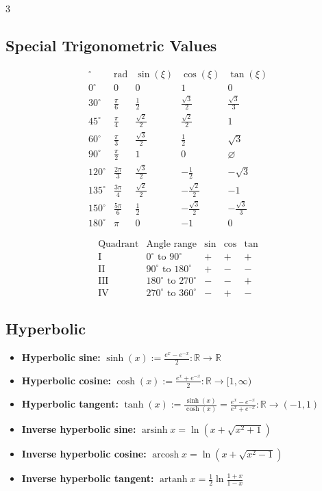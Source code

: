 \begin{multicols}{3}
\subsection*{Special Trigonometric Values}
\[
\begin{array}{c|c|c|c|c}
^\circ & \mathrm{rad} & \sin(\xi) & \cos(\xi) & \tan(\xi)\\
\hline
0^\circ & 0 & 0 & 1 & 0\\
30^\circ & \frac{\pi}{6} & \frac12 & \frac{\sqrt3}{2} & \frac{\sqrt3}{3}\\
45^\circ & \frac{\pi}{4} & \frac{\sqrt2}{2} & \frac{\sqrt2}{2} & 1\\
60^\circ & \frac{\pi}{3} & \frac{\sqrt3}{2} & \frac12 & \sqrt3\\
90^\circ & \frac{\pi}{2} & 1 & 0 & \varnothing\\
120^\circ & \frac{2\pi}{3} & \frac{\sqrt3}{2} & -\frac12 & -\sqrt3\\
135^\circ & \frac{3\pi}{4} & \frac{\sqrt2}{2} & -\frac{\sqrt2}{2} & -1\\
150^\circ & \frac{5\pi}{6} & \frac12 & -\frac{\sqrt3}{2} & -\frac{\sqrt3}{3}\\
180^\circ & \pi & 0 & -1 & 0
\end{array}
\]

\[
\begin{array}{c|c|c|c|c}
\text{Quadrant} & \text{Angle range} & \sin & \cos & \tan \\
\hline
\text{I} & 0^\circ \text{ to } 90^\circ & + & + & + \\
\text{II} & 90^\circ \text{ to } 180^\circ & + & - & - \\
\text{III} & 180^\circ \text{ to } 270^\circ & - & - & + \\
\text{IV} & 270^\circ \text{ to } 360^\circ & - & + & -
\end{array}
\]

\subsection*{Hyperbolic}
\begin{itemize}[noitemsep, topsep=0pt, leftmargin=*]
\item \textbf{Hyperbolic sine:} $\sinh(x):=\frac{e^x-e^{-x}}{2}:\mathbb{R}\to\mathbb{R}$
\item \textbf{Hyperbolic cosine:} $\cosh(x):=\frac{e^x+e^{-x}}{2}:\mathbb{R}\to[1,\infty)$
\item \textbf{Hyperbolic tangent:} $\tanh(x):=\frac{\sinh(x)}{\cosh(x)}=\frac{e^x-e^{-x}}{e^x+e^{-x}}:\mathbb{R}\to(-1,1)$
\item \textbf{Inverse hyperbolic sine:} $\operatorname{arsinh}x=\ln(x+\sqrt{x^2+1})$
\item \textbf{Inverse hyperbolic cosine:} $\operatorname{arcosh}x=\ln(x+\sqrt{x^2-1})$
\item \textbf{Inverse hyperbolic tangent:} $\operatorname{artanh}x=\frac12\ln\frac{1+x}{1-x}$
\end{itemize}


\end{multicols}
